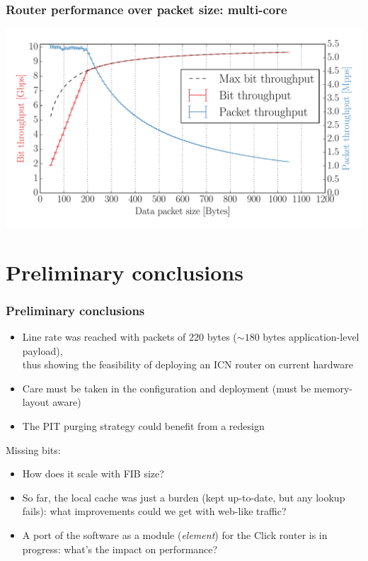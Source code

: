 \begin{frame}[fragile]
  \frametitle{Router performance over packet size: multi-core}
  
  \includegraphics[width=\textwidth]{img/augustus_increasing_len_0xF.pdf}
\end{frame}

\section{Preliminary conclusions}
\begin{frame}[fragile]
  \frametitle{Preliminary conclusions}
  \begin{itemize}
    \item Line rate was reached with packets of $220$ bytes ($\sim180$ bytes application-level payload),\\
      thus showing the feasibility of deploying an ICN router on current hardware
    \item Care must be taken in the configuration and deployment (must be memory-layout aware)
    \item The PIT purging strategy could benefit from a redesign
  \end{itemize}

  \onslide<+->
  \onslide<+->
  Missing bits:

  \begin{itemize}
    \item<+-> How does it scale with FIB size?
    \item<+-> So far, the local cache was just a burden (kept up-to-date, but any lookup fails): what improvements could we get with web-like traffic?
    \item<+-> A port of the software as a module (\textit{element}) for the Click router is in progress: what's the impact on performance?
  \end{itemize}
\end{frame}


